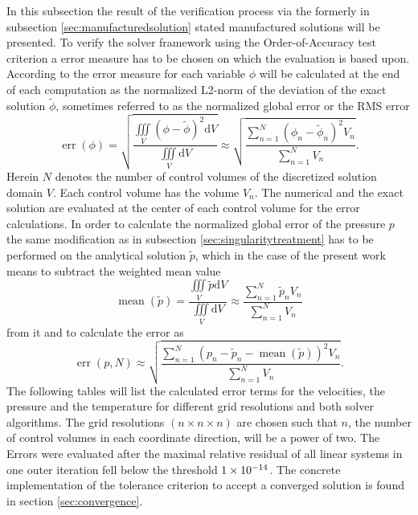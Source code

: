 In this subsection the result of the verification process via the formerly in subsection \ref{sec:manufacturedsolution} stated manufactured solutions will be presented. To verify the solver framework using the Order-of-Accuracy test criterion a error measure has to be chosen on which the evaluation is based upon. According to \cite{salari00} the error measure for each variable \(\phi\) will be calculated at the end of each computation as the normalized L2-norm of the deviation of the exact solution \(\tilde{\phi}\), sometimes referred to as the normalized global error or the RMS error
\begin{displaymath}
  \operatorname{err}(\phi) = \sqrt{ \frac {\iiint\limits_V \left( \phi - \tilde{\phi} \right)^2 \mathrm{d}V }{\iiint\limits_V \mathrm{d}V }} \approx \sqrt{ \frac{ \sum_{n=1}^N \left(\phi_n - \tilde{\phi}_n \right)^2 V_n }{\sum_{n=1}^{N} V_n}} .
\end{displaymath}
Herein \(N\) denotes the number of control volumes of the discretized solution domain \(V\). Each control volume has the volume \(V_n\). The numerical and the exact solution are evaluated at the center of each control volume for the error calculations. In order to calculate the normalized global error of the pressure \(p\) the same modification as in subsection \ref{sec:singularitytreatment} has to be performed on the analytical solution \(\tilde{p}\), which in the case of the present work means to subtract the weighted mean value
\begin{displaymath}
  \operatorname{mean}\left( \tilde{p} \right) = \frac{\iiint\limits_V \tilde{p} \mathrm{d}V}{\iiint\limits_V \mathrm{d}V} \approx \frac{\sum_{n=1}^N \tilde{p}_n V_n}{\sum_{n=1}^N V_n}
\end{displaymath}
from it and to calculate the error as
\begin{displaymath}
  \operatorname{err}(p,N) \approx \sqrt{ \frac{ \sum_{n=1}^N \left(p_n - \tilde{p}_n -\operatorname{mean}\left(\tilde{p}\right) \right)^2 V_n }{\sum_{n=1}^{N} V_n}} .
\end{displaymath}
The following tables will list the calculated error terms for the velocities, the pressure and the temperature for different grid resolutions and both solver algorithms. The grid resolutions \((n \times n \times n)\) are chosen such that \(n\), the number of control volumes in each coordinate direction, will be a power of two. The Errors were evaluated after the maximal relative residual of all linear systems in one outer iteration fell below the threshold \(1\times 10^{-14}\). The concrete implementation of the tolerance criterion to accept a converged solution is found in section \ref{sec:convergence}.

